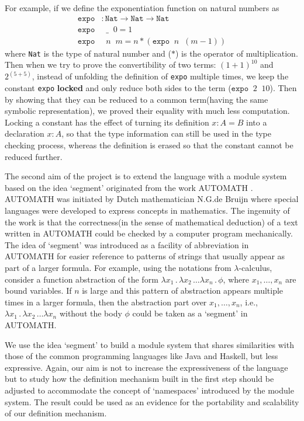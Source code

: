 For example, if we define the exponentiation function on natural numbers as
\begin{align*}
  \texttt{expo} &: \texttt{Nat} \to \texttt{Nat} \to \texttt{Nat} \\
  \texttt{expo} &\;\; \_\;\; 0 = 1 \\
  \texttt{expo} &\;\; n \;\; m = n * (\texttt{expo} \;\; n \;\; (m - 1))
\end{align*}
where \texttt{Nat} is the type of natural number and ($*$) is the operator of multiplication. Then when we try to prove the convertibility of two terms: $(1 + 1)^{10}$ and $2 ^ {(5+5)}$, instead of unfolding the definition of \texttt{expo} multiple times, we keep the constant \texttt{expo} \textbf{locked} and only reduce both sides to the term ($\texttt{expo} \;\; 2 \;\; 10$). Then by showing that they can be reduced to a common term(having the same symbolic representation), we proved their equality with much less computation. Locking a constant has the effect of turning its definition $x : A = B$ into a declaration $x : A$, so that the type information can still be used in the type checking process, whereas the definition is erased so that the constant cannot be reduced further.

The second aim of the project is to extend the language with a module system based on the idea `segment' originated from the work AUTOMATH \cite{de1994survey}. AUTOMATH was initiated by Dutch mathematician N.G.de Bruijn where special languages were developed to express concepts in mathematics. The ingenuity of the work is that the correctness(in the sense of mathematical deduction) of a text written in AUTOMATH could be checked by a computer program mechanically. The idea of `segment' was introduced as a facility of abbreviation in AUTOMATH for easier reference to patterns of strings that usually appear as part of a larger formula. For example, using the notations from $\lambda$-calculus, consider a function abstraction of the form $\lambda x_1\,.\,\lambda x_2\,\dots\lambda x_n\,.\,\phi$, where $x_1,\dots,x_n$ are bound variables. If $n$ is large and this pattern of abstraction appears multiple times in a larger formula, then the abstraction part over $x_1,\dots,x_n$, i.e., $\lambda x_1\,.\,\lambda x_2\,\dots\lambda x_n$ without the body $\phi$ could be taken as a `segment' in AUTOMATH.

We use the idea `segment' to build a module system that shares similarities with those of the common programming languages like Java and Haskell, but less expressive. Again, our aim is not to increase the expressiveness of the language but to study how the definition mechanism built in the first step should be adjusted to accommodate the concept of `namespaces' introduced by the module system. The result could be used as an evidence for the portability and scalability of our definition mechanism.

